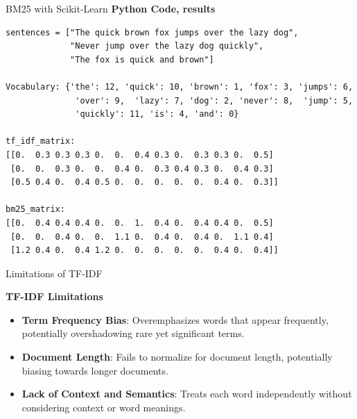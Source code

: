 \documentclass{beamer}
\begin{document}
\begin{frame}[fragile]{BM25 with Scikit-Learn}
\small
\textbf{Python Code, results}
\begin{tcolorbox}[colback=lightgray, colframe=lightgray,
                  boxsep=0mm, arc=1mm, boxrule=0mm,
                  left=1mm, right=1mm, top=1mm, bottom=1mm]
\begin{Verbatim}[fontsize=\scriptsize, bgcolor=lightgray]
sentences = ["The quick brown fox jumps over the lazy dog",
             "Never jump over the lazy dog quickly",
             "The fox is quick and brown"]

Vocabulary: {'the': 12, 'quick': 10, 'brown': 1, 'fox': 3, 'jumps': 6,
              'over': 9,  'lazy': 7, 'dog': 2, 'never': 8,  'jump': 5,
              'quickly': 11, 'is': 4, 'and': 0}

tf_idf_matrix:
[[0.  0.3 0.3 0.3 0.  0.  0.4 0.3 0.  0.3 0.3 0.  0.5]
 [0.  0.  0.3 0.  0.  0.4 0.  0.3 0.4 0.3 0.  0.4 0.3]
 [0.5 0.4 0.  0.4 0.5 0.  0.  0.  0.  0.  0.4 0.  0.3]]

bm25_matrix:
[[0.  0.4 0.4 0.4 0.  0.  1.  0.4 0.  0.4 0.4 0.  0.5]
 [0.  0.  0.4 0.  0.  1.1 0.  0.4 0.  0.4 0.  1.1 0.4]
 [1.2 0.4 0.  0.4 1.2 0.  0.  0.  0.  0.  0.4 0.  0.4]]
\end{Verbatim}
\end{tcolorbox}
\end{frame}

\begin{frame}{Limitations of TF-IDF}

\textbf{TF-IDF Limitations}
\begin{itemize}
  \item \textbf{Term Frequency Bias}: Overemphasizes words that appear frequently, potentially overshadowing rare yet significant terms.
  \item \textbf{Document Length}: Fails to normalize for document length, potentially biasing towards longer documents.
  \item \textbf{Lack of Context and Semantics}: Treats each word independently without considering context or word meanings.
\end{itemize}
\end{frame}
\end{document}
